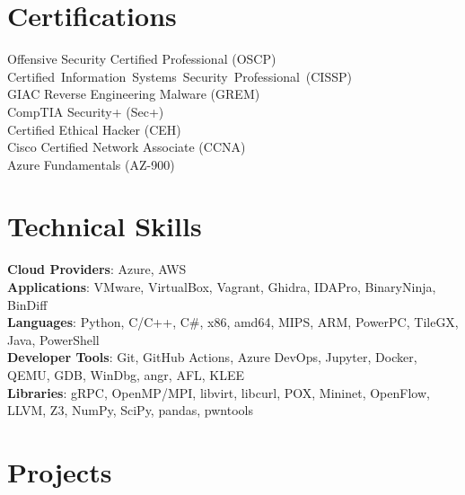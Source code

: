 \documentclass[letterpaper,11pt]{article}
\begin{document}
\section{\textbf{Certifications}}
\vspace{-5mm}
\setlength{\columnsep}{50pt}
\begin{multicols}{2}
	\begin{itemize}[noitemsep]
		\small{\item[] {Offensive Security Certified Professional (OSCP) \\
			\mbox{Certified Information Systems Security Professional (CISSP)} \\
			GIAC Reverse Engineering Malware (GREM) \\
			CompTIA Security+ (Sec+) \\
			Certified Ethical Hacker (CEH) \\
			Cisco Certified Network Associate (CCNA) \\
			Azure Fundamentals (AZ-900)
			}}
	\end{itemize}
\end{multicols}

\section{\textbf{Technical Skills}}
\begin{itemize}[leftmargin=0.15in, label={}]
	\small{\item{
		            \textbf{Cloud Providers}{: Azure, AWS} \\
		            \textbf{Applications}{: VMware, VirtualBox, Vagrant, Ghidra, IDAPro, BinaryNinja, BinDiff} \\
		            \textbf{Languages}{: Python, C/C++, C\#, x86, amd64, MIPS, ARM, PowerPC, TileGX, Java, PowerShell} \\
		            \textbf{Developer Tools}{: Git, GitHub Actions, Azure DevOps, Jupyter, Docker, QEMU, GDB, WinDbg, angr, AFL, KLEE} \\
		            \textbf{Libraries}{: gRPC, OpenMP/MPI, libvirt, libcurl, POX, Mininet, OpenFlow, LLVM, Z3, NumPy, SciPy, pandas, pwntools}
		      }}
\end{itemize}

\section{\textbf{Projects}}
\end{document}
